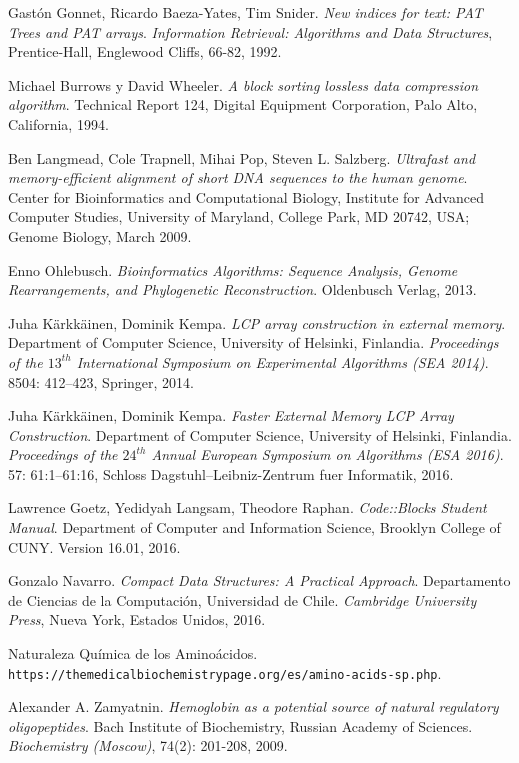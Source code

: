 \documentclass[letterpaper, 10pt, notitlepage]{report}
\begin{document}
\begin{thebibliography}{9}
Gastón Gonnet, Ricardo Baeza-Yates, Tim Snider.
\textit{New indices for text: PAT Trees and PAT arrays}.
\textit{Information Retrieval: Algorithms and Data Structures}, Prentice-Hall, Englewood Cliffs, 66-82, 1992.

Michael Burrows y David Wheeler.
\textit{A block sorting lossless data compression algorithm}. 
Technical Report 124, Digital Equipment Corporation, Palo Alto, California, 1994.

Ben Langmead, Cole Trapnell, Mihai Pop, Steven L. Salzberg.
\textit{Ultrafast and memory-efficient alignment of short DNA sequences to the human genome}. 
Center for Bioinformatics and Computational Biology, Institute for Advanced Computer Studies, University of Maryland, College Park, MD 20742, USA; Genome Biology, March 2009.

Enno Ohlebusch.
\textit{Bioinformatics Algorithms: Sequence Analysis, Genome Rearrangements, and Phylogenetic Reconstruction}. 
Oldenbusch Verlag, 2013.

Juha Kärkkäinen, Dominik Kempa.
\textit{LCP array construction in external memory}.
Department of Computer Science, University of Helsinki, Finlandia.
\textit{Proceedings of the $13^{th}$ International Symposium on Experimental Algorithms (SEA 2014)}.
8504: 412–423, Springer, 2014.

Juha Kärkkäinen, Dominik Kempa.
\textit{Faster External Memory LCP Array Construction}.
Department of Computer Science, University of Helsinki, Finlandia.
\textit{Proceedings of the $24^{th}$ Annual European Symposium on Algorithms (ESA 2016)}.
57: 61:1–61:16, Schloss Dagstuhl–Leibniz-Zentrum fuer Informatik, 2016.

Lawrence Goetz, Yedidyah Langsam, Theodore Raphan.
\textit{Code::Blocks Student Manual}.
Department of Computer and Information Science, Brooklyn College of CUNY.
Version 16.01, 2016.

Gonzalo Navarro.
\textit{Compact Data Structures: A Practical Approach}.
Departamento de Ciencias de la Computación, Universidad de Chile.
\textit{Cambridge University Press}, Nueva York, Estados Unidos, 2016.

Naturaleza Química de los Aminoácidos.
\\\texttt{https://themedicalbiochemistrypage.org/es/amino-acids-sp.php}.

Alexander A. Zamyatnin.
\textit{Hemoglobin as a potential source of natural regulatory oligopeptides}.
Bach Institute of Biochemistry, Russian Academy of Sciences.
\textit{Biochemistry (Moscow)}, 74(2): 201-208, 2009.


\end{thebibliography}
\end{document}
